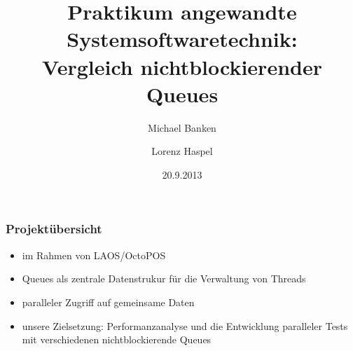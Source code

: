 \documentclass[svgnames]{beamer}
\institute{Friedrich-Alexander Universit\"at Erlangen-N\"urnberg}
\title[Vergleich nichtblockierender Queues]{Praktikum angewandte Systemsoftwaretechnik: \\
Vergleich nichtblockierender Queues}
\author{Michael Banken \and Lorenz Haspel} %
\date{20.9.2013} %
\begin{document}
\begin{frame}

	\titlepage
\end{frame}

\begin{frame}
\frametitle{Projekt\"ubersicht}
\begin{itemize}
\item im Rahmen von LAOS/OctoPOS
\item Queues als zentrale Datenstrukur f\"ur die Verwaltung von Threads
\item paralleler Zugriff auf gemeinsame Daten
\item unsere Zielsetzung: Performanzanalyse und die Entwicklung
paralleler Tests mit verschiedenen nichtblockierende Queues
\end{itemize}
\end{frame}
\end{document}
